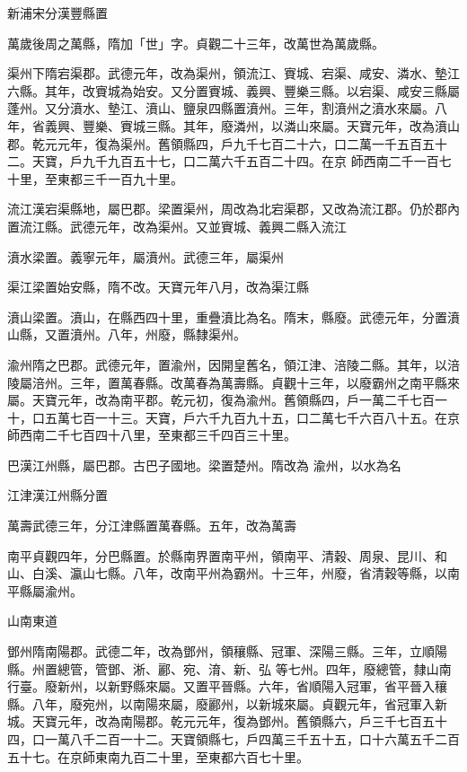 \begin{pinyinscope}
 新浦宋分漢豐縣置



 萬歲後周之萬縣，隋加「世」字。貞觀二十三年，改萬世為萬歲縣。



 渠州下隋宕渠郡。武德元年，改為渠州，領流江、賨城、宕渠、咸安、潾水、墊江六縣。其年，改賨城為始安。又分置賨城、義興、豐樂三縣。以宕渠、咸安三縣屬蓬州。又分濆水、墊江、濆山、鹽泉四縣置濆州。三年，割濆州之濆水來屬。八年，省義興、豐樂、賨城三縣。其年，廢潾州，以潾山來屬。天寶元年，改為濆山郡。乾元元年，復為渠州。舊領縣四，戶九千七百二十六，口二萬一千五百五十二。天寶，戶九千九百五十七，口二萬六千五百二十四。在京
 師西南二千一百七十里，至東都三千一百九十里。



 流江漢宕渠縣地，屬巴郡。梁置渠州，周改為北宕渠郡，又改為流江郡。仍於郡內置流江縣。武德元年，改為渠州。又並賨城、義興二縣入流江



 濆水梁置。義寧元年，屬濆州。武德三年，屬渠州



 渠江梁置始安縣，隋不改。天寶元年八月，改為渠江縣



 濆山梁置。濆山，在縣西四十里，重疊濆比為名。隋末，縣廢。武德元年，分置濆山縣，又置濆州。八年，州廢，縣隸渠州。



 渝州隋之巴郡。武德元年，置渝州，因開皇舊名，領江津、涪陵二縣。其年，以涪陵屬涪州。三年，置萬春縣。改萬春為萬壽縣。貞觀十三年，以廢霸州之南平縣來屬。天寶元年，改為南平郡。乾元初，復為渝州。舊領縣四，戶一萬二千七百一十，口五萬七百一十三。天寶，戶六千九百九十五，口二萬七千六百八十五。在京師西南二千七百四十八里，至東都三千四百三十里。



 巴漢江州縣，屬巴郡。古巴子國地。梁置楚州。隋改為
 渝州，以水為名



 江津漢江州縣分置



 萬壽武德三年，分江津縣置萬春縣。五年，改為萬壽



 南平貞觀四年，分巴縣置。於縣南界置南平州，領南平、清穀、周泉、昆川、和山、白溪、瀛山七縣。八年，改南平州為霸州。十三年，州廢，省清穀等縣，以南平縣屬渝州。



 山南東道



 鄧州隋南陽郡。武德二年，改為鄧州，領穰縣、冠軍、深陽三縣。三年，立順陽縣。州置總管，管鄧、淅、酈、宛、淯、新、弘
 等七州。四年，廢總管，隸山南行臺。廢新州，以新野縣來屬。又置平晉縣。六年，省順陽入冠軍，省平晉入穰縣。八年，廢宛州，以南陽來屬，廢酈州，以新城來屬。貞觀元年，省冠軍入新城。天寶元年，改為南陽郡。乾元元年，復為鄧州。舊領縣六，戶三千七百五十四，口一萬八千二百一十二。天寶領縣七，戶四萬三千五十五，口十六萬五千二百五十七。在京師東南九百二十里，至東都六百七十里。




\end{pinyinscope}
